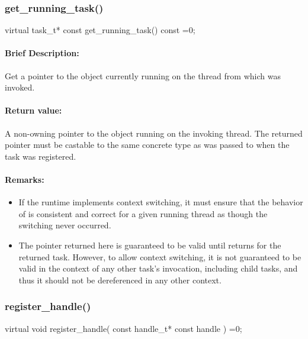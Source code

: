 \subsubsection{get\_running\_task()}
\begin{CppCode}
virtual task_t* const
    get_running_task() const =0;
\end{CppCode}

\paragraph{Brief Description:} Get a pointer to the  object currently running on the thread 
from which  was invoked.

\paragraph{Return value:} A non-owning pointer to the  object running on the invoking
thread.  The returned pointer must be castable to the same concrete type as was passed to  when the task was registered.

\paragraph{Remarks:}
\begin{itemize}
\item If the runtime implements context switching, it must ensure that
     the behavior of  is consistent and correct for a given
     running thread as though the switching never occurred.
\item The pointer returned here is guaranteed to be valid until  returns for
     the returned task.  However, to allow context switching, it is not guaranteed to be valid
     in the context of any other task's  invocation, including child tasks, and thus it should
     not be dereferenced in any other context.
\end{itemize}

\subsubsection{register\_handle()}
\begin{CppCode}
virtual void register_handle(
      const handle_t* const handle
    ) =0;
\end{CppCode}

